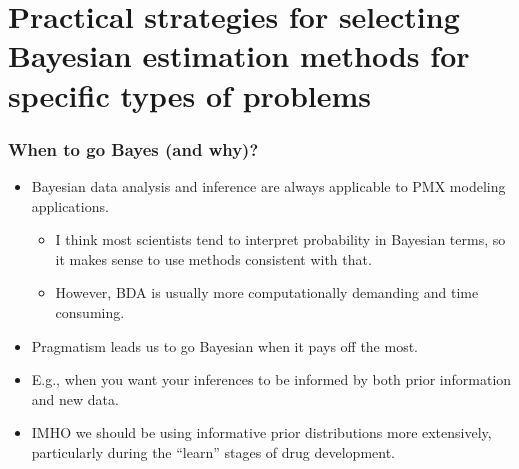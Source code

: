 \documentclass{beamer}
\begin{document}
\section[Selecting Bayesian estimation methods]{Practical strategies for selecting Bayesian estimation methods for specific types of problems}

  


\begin{frame}
  \frametitle{When to go Bayes (and why)?}
  
  \begin{itemize}
    \item<1-> Bayesian data analysis and inference are always applicable to
      PMX modeling applications. 
    \begin{itemize}
      \item<2-> I think most scientists tend to
      interpret probability in Bayesian terms, so it makes sense to use
      methods consistent with that. 
      \item<3-> However, BDA is usually more
          computationally demanding and time consuming.
    \end{itemize}
    \item<4-> Pragmatism leads us to go Bayesian when it pays off the most.
    \item<5-> E.g., when you want your inferences to be informed by both prior
      information and new data.
    \item<6-> IMHO we should be using informative prior distributions more
      extensively, particularly during the “learn” stages of drug
      development.
  \end{itemize}

\end{frame}

  
\end{document}
